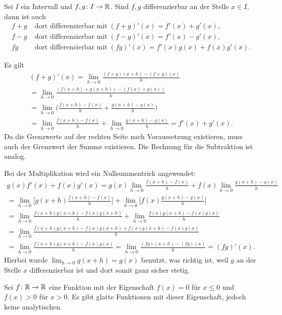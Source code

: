 \begin{Satz}
Sei $I$ ein Intervall und $f,g\colon I\to\mathbb R$. Sind $f,g$
differenzierbar an der Stelle $x\in I$, dann ist auch%
\begin{align*}
f+g&\;\text{dort differenzierbar mit}\;(f+g)'(x)=f'(x)+g'(x),\\
f-g&\;\text{dort differenzierbar mit}\;(f-g)'(x)=f'(x)-g'(x),\\
fg&\;\text{dort differenzierbar mit}\;(fg)'(x)=f'(x)g(x)+f(x)g'(x).
\end{align*}
\end{Satz}

\begin{Beweis} Es gilt
\begin{gather}
(f+g)'(x)
= \lim_{h\to 0}\frac{(f+g)(x+h)-(f+g)(x)}{h}\\
= \lim_{h\to 0}\frac{(f(x+h)+g(x+h))-(f(x)+g(x))}{h}\\
= \lim_{h\to 0}\bigg(\frac{f(x+h)-f(x)}{h}+\frac{g(x+h)-g(x)}{h}\bigg)\\
= \lim_{h\to 0}\frac{f(x+h)-f(x)}{h}+\lim_{h\to 0}\frac{g(x+h)-g(x)}{h}
= f'(x)+g'(x).
\end{gather}
Da die Grenzwerte auf der rechten Seite nach Voraussetzung existieren,
muss auch der Grenzwert der Summe existieren.
Die Rechnung für die Subtraktion ist analog.

Bei der Multiplikation wird ein Nullsummentrick angewendet:
\begin{gather}
g(x)f'(x)+f(x)g'(x)
= g(x)\lim_{h\to 0}\frac{f(x+h)-f(x)}{h}
+ f(x)\lim_{h\to 0}\frac{g(x+h)-g(x)}{h}\\
= \lim_{h\to 0}\bigg[g(x+h)\frac{f(x+h)-f(x)}{h}\bigg]
+ \lim_{h\to 0}\bigg[f(x)\frac{g(x+h)-g(x)}{h}\bigg]\\
= \lim_{h\to 0}\frac{f(x+h)g(x+h)-f(x)g(x+h)}{h}
+ \lim_{h\to 0}\frac{f(x)g(x+h)-f(x)g(x)}{h}\\
= \lim_{h\to 0}\frac{f(x+h)g(x+h)-f(x)g(x+h)+f(x)g(x+h)-f(x)g(x)}{h}\\
= \lim_{h\to 0}\frac{f(x+h)g(x+h)-f(x)g(x)}{h}
= \lim_{h\to 0}\frac{(fg)(x+h)-(fg)(x)}{h}
= (fg)'(x).
\end{gather}
Hierbei wurde $\lim_{h\to 0}g(x+h)=g(x)$ benutzt, was richtig ist,
weil $g$ an der Stelle $x$ differenzierbar ist und dort somit ganz
sicher stetig.\;\qedsymbol
\end{Beweis}

\begin{Satz}
Sei $f\colon\mathbb R\to\mathbb R$ eine Funktion mit der Eigenschaft
$f(x)=0$ für $x\le 0$ und $f(x)>0$ für $x>0$. Es gibt glatte Funktionen
mit dieser Eigenschaft, jedoch keine analytischen.
\end{Satz}

